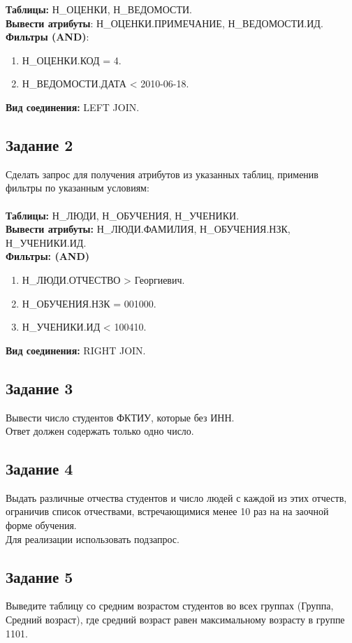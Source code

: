 \documentclass{article}
\begin{document}
\textbf{Таблицы:} Н\_ОЦЕНКИ, Н\_ВЕДОМОСТИ. \\
\textbf{Вывести атрибуты}: Н\_ОЦЕНКИ.ПРИМЕЧАНИЕ, Н\_ВЕДОМОСТИ.ИД. \\
\textbf{Фильтры (AND)}:
\begin{enumerate}
    \item Н\_ОЦЕНКИ.КОД = 4.
    \item Н\_ВЕДОМОСТИ.ДАТА < 2010-06-18.
\end{enumerate}

\textbf{Вид соединения:} LEFT JOIN.

\subsection{Задание 2}
Сделать запрос для получения атрибутов из указанных таблиц, применив фильтры по указанным условиям:  \\ \\

\textbf{Таблицы:} Н\_ЛЮДИ, Н\_ОБУЧЕНИЯ, Н\_УЧЕНИКИ. \\
\textbf{Вывести атрибуты:} Н\_ЛЮДИ.ФАМИЛИЯ, Н\_ОБУЧЕНИЯ.НЗК, Н\_УЧЕНИКИ.ИД. \\
\textbf{Фильтры: (AND)}
\begin{enumerate}
    \item Н\_ЛЮДИ.ОТЧЕСТВО > Георгиевич.
    \item Н\_ОБУЧЕНИЯ.НЗК = 001000.
    \item Н\_УЧЕНИКИ.ИД < 100410.
\end{enumerate}

\textbf{Вид соединения:} RIGHT JOIN.

\subsection{Задание 3}
Вывести число студентов ФКТИУ, которые без ИНН. \\
Ответ должен содержать только одно число.

\subsection{Задание 4}
Выдать различные отчества студентов и число людей с каждой из этих отчеств, ограничив список отчествами, встречающимися менее 10 раз на на заочной форме обучения. \\
Для реализации использовать подзапрос.

\subsection{Задание 5}
Выведите таблицу со средним возрастом студентов во всех группах (Группа, Средний возраст), где средний возраст равен максимальному возрасту в группе 1101.
\end{document}
